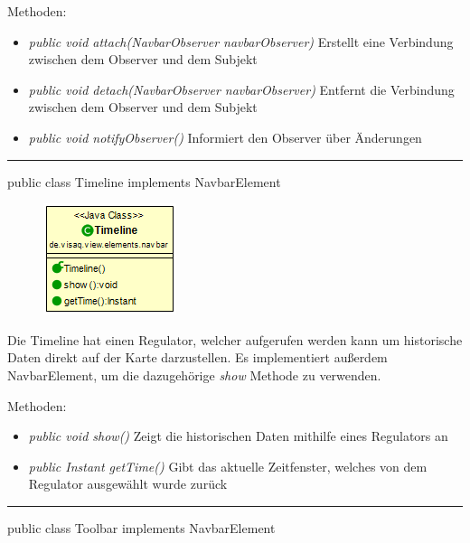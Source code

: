 Methoden:
\begin{itemize}
    \item \emph{public void attach(NavbarObserver navbarObserver)} Erstellt eine Verbindung zwischen dem Observer und dem Subjekt 
    \item \emph{public void detach(NavbarObserver navbarObserver)} Entfernt die Verbindung zwischen dem Observer und dem Subjekt
    \item \emph{public void notifyObserver()} Informiert den Observer über Änderungen
\end{itemize}

\rule{\textwidth}{0.4pt}
public class Timeline implements NavbarElement

\begin{minipage}{0.3\textwidth}
    \begin{figure}[H]
        \includegraphics[scale = 0.7]{media/frontend/view/de.view.elements.navbar/TimelineClass.png}
    \end{figure}
    \end{minipage} \hfill
\begin{minipage}{0.6\textwidth}
Die Timeline hat einen Regulator, welcher aufgerufen werden kann um historische Daten direkt auf der Karte darzustellen. Es implementiert außerdem NavbarElement, um die dazugehörige \emph{show} Methode zu verwenden.
\end{minipage}

Methoden:
\begin{itemize}
    \item \emph{public void show()} Zeigt die historischen Daten mithilfe eines Regulators an
    \item \emph{public Instant getTime()} Gibt das aktuelle Zeitfenster, welches von dem Regulator ausgewählt wurde zurück
\end{itemize}

\rule{\textwidth}{0.4pt}
public class Toolbar implements NavbarElement

